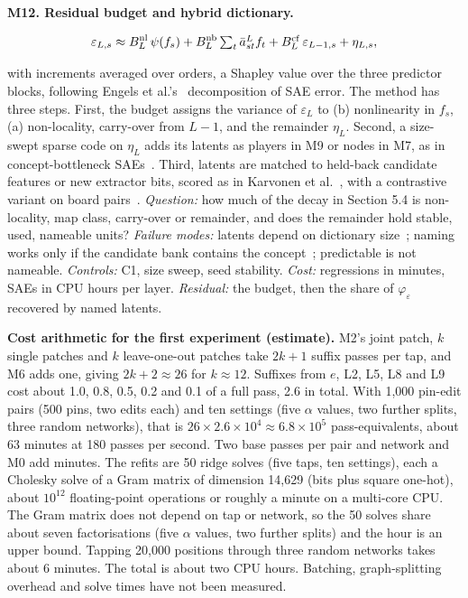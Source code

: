 \documentclass[conference]{IEEEtran}
\begin{document}
\textbf{M12. Residual budget and hybrid dictionary.}

\[
\varepsilon_{L,s}\approx B^{\rm nl}_L\,\psi(f_s)+B^{\rm nb}_L\textstyle\sum_t\bar a^L_{st}f_t+B^{\rm cf}_L\,\varepsilon_{L-1,s}+\eta_{L,s},
\]

with increments averaged over orders, a Shapley value over the three predictor blocks, following Engels et al.'s~\cite{engels2025} decomposition of SAE error. The method has three steps. First, the budget assigns the variance of $\varepsilon_L$ to (b) nonlinearity in $f_s$, (a) non-locality, carry-over from $L-1$, and the remainder $\eta_L$. Second, a size-swept sparse code on $\eta_L$ adds its latents as players in M9 or nodes in M7, as in concept-bottleneck SAEs~\cite{kulkarni2026}. Third, latents are matched to held-back candidate features or new extractor bits, scored as in Karvonen et al.~\cite{karvonen2024}, with a contrastive variant on board pairs~\cite{poupart2024}. \emph{Question:} how much of the decay in Section 5.4 is non-locality, map class, carry-over or remainder, and does the remainder hold stable, used, nameable units? \emph{Failure modes:} latents depend on dictionary size~\cite{leask2025}; naming works only if the candidate bank contains the concept~\cite{shang2024}; predictable is not nameable. \emph{Controls:} C1, size sweep, seed stability. \emph{Cost:} regressions in minutes, SAEs in CPU hours per layer. \emph{Residual:} the budget, then the share of $\varphi_\varepsilon$ recovered by named latents.

\textbf{Cost arithmetic for the first experiment (estimate).} M2's joint patch, $k$ single patches and $k$ leave-one-out patches take $2k+1$ suffix passes per tap, and M6 adds one, giving $2k+2\approx26$ for $k\approx12$. Suffixes from $e$, L2, L5, L8 and L9 cost about 1.0, 0.8, 0.5, 0.2 and 0.1 of a full pass, 2.6 in total. With 1,000 pin-edit pairs (500 pins, two edits each) and ten settings (five $\alpha$ values, two further splits, three random networks), that is $26\times2.6\times10^4\approx6.8\times10^5$ pass-equivalents, about 63 minutes at 180 passes per second. Two base passes per pair and network and M0 add minutes. The refits are 50 ridge solves (five taps, ten settings), each a Cholesky solve of a Gram matrix of dimension 14,629 (bits plus square one-hot), about $10^{12}$ floating-point operations or roughly a minute on a multi-core CPU. The Gram matrix does not depend on tap or network, so the 50 solves share about seven factorisations (five $\alpha$ values, two further splits) and the hour is an upper bound. Tapping 20,000 positions through three random networks takes about 6 minutes. The total is about two CPU hours. Batching, graph-splitting overhead and solve times have not been measured.
\end{document}
